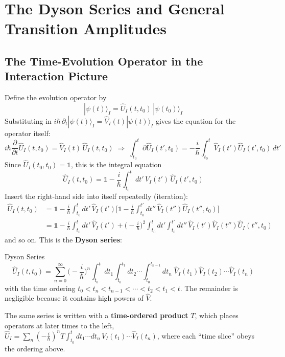 \documentclass[11pt,a4paper]{article}
\begin{document}
\section{The Dyson Series and General Transition Amplitudes}

\subsection{The Time-Evolution Operator in the Interaction Picture}
Define the evolution operator by
\[
|\psi(t)\rangle_I = \hat U_I(t,t_0)\,|\psi(t_0)\rangle_I
\]
Substituting in $i\hbar\,\partial_t|\psi(t)\rangle_I=\hat V_I(t)|\psi(t)\rangle_I$ gives the equation for the operator itself:
\[
i\hbar\frac\partial{\partial t}\hat U_I(t,t_0)=\hat V_I(t)\,\hat U_I(t,t_0)
\;\Longrightarrow\;
\int_{t_0}^t\partial\hat U_I(t',t_0)=-\frac i\hbar\int_{t_0}^t\hat V_I(t')\hat U_I(t',t_0)\,dt'
\]
Since $\hat U_I(t_0,t_0)=\mathbb 1$, this is the integral equation
\[
\hat U_I(t,t_0) = \mathbb 1 - \frac i\hbar\int_{t_0}^tdt'\,\hat V_I(t')\,\hat U_I(t',t_0)
\]
Insert the right-hand side into itself repeatedly (iteration):
\begin{align*}
\hat U_I(t,t_0) &= \mathbb 1 - \frac i\hbar\int_{t_0}^tdt'\,\hat V_I(t')\Big[\mathbb 1-\frac i\hbar\int_{t_0}^{t'}dt''\,\hat V_I(t'')\hat U_I(t'',t_0)\Big]\\
&= \mathbb 1 - \frac i\hbar\int_{t_0}^tdt'\,\hat V_I(t') + \Big(-\frac i\hbar\Big)^2\int_{t_0}^tdt'\int_{t_0}^{t'}dt''\,\hat V_I(t')\hat V_I(t'')\hat U_I(t'',t_0)
\end{align*}
and so on. This is the \textbf{Dyson series}:
\begin{thm}{Dyson Series}
\[
\hat U_I(t,t_0) = \sum_{n=0}^\infty\Big(-\frac i\hbar\Big)^n\int_{t_0}^tdt_1\int_{t_0}^{t_1}dt_2\cdots\int_{t_0}^{t_{n-1}}dt_n\;\hat V_I(t_1)\hat V_I(t_2)\cdots\hat V_I(t_n)
\]
with the time ordering $t_0<t_n<t_{n-1}<\cdots<t_2<t_1<t$. The remainder is negligible because it contains high powers of $\hat V$.
\end{thm}
The same series is written with a \textbf{time-ordered product} $T$, which places operators at later times to the left, $\hat U_I=\sum_n(-\frac i\hbar)^nT\int_{t_0}^t dt_1\cdots dt_n\,\hat V_I(t_1)\cdots\hat V_I(t_n)$, where each ``time slice'' obeys the ordering above.

\begin{center}
\end{center}
\end{document}
